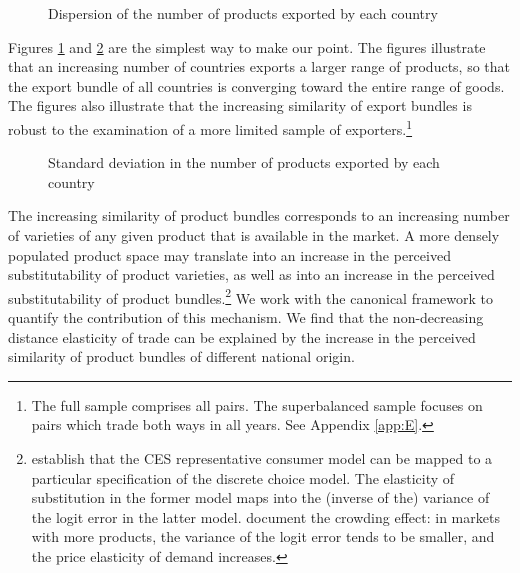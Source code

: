 \documentclass[12pt,twoside,a4paper,notitlepage]{article}
\begin{document}
\begin{figure}[h!]
	\caption{Dispersion of the number of products exported by each country \label{fig:vioplot}}
	\begin{center}
		\setlength{\fboxrule}{1pt} %
		\setlength{\fboxsep}{.1in} %
	\end{center}
\end{figure}


Figures \ref{fig:vioplot} and \ref{fig:fall_of_sd} are the simplest way to make our point. 
The figures illustrate that an increasing number of countries exports a larger range of products, so that the export bundle of all countries is converging toward the entire range of goods.
The figures also illustrate that the increasing similarity of export bundles is robust to the examination of a more limited sample of exporters.\footnote{The full sample comprises all pairs. The superbalanced sample focuses on pairs which trade both ways in all years. See Appendix \ref{app:E}.} 

\begin{figure}[h!]
	\caption{Standard deviation in the number of products exported by each country \label{fig:fall_of_sd}}
	\begin{center}
		\setlength{\fboxrule}{1pt} %
		\setlength{\fboxsep}{.1in} %
	\end{center}
\end{figure}

The increasing similarity of product bundles corresponds to an increasing number of varieties of any given product that is available in the market. 
A more densely populated product space may translate into an increase in the perceived substitutability of product varieties, as well as into an increase in the perceived substitutability of product bundles.\footnote{\cite{Anderson1992} establish that the CES representative consumer model can be mapped to a particular specification of the discrete choice model. The elasticity of substitution in the former model maps into the (inverse of the) variance of the logit error in the latter model. \cite{Ackerberg2005} document the crowding effect: in markets with more products, the variance of the logit error tends to be smaller, and the price elasticity of demand increases.}
We work with the canonical \cite{Anderson2003} framework to quantify the contribution of this mechanism.
We find that the non-decreasing distance elasticity of trade can be explained by the increase in the perceived similarity of product bundles of different national origin. 
\end{document}
